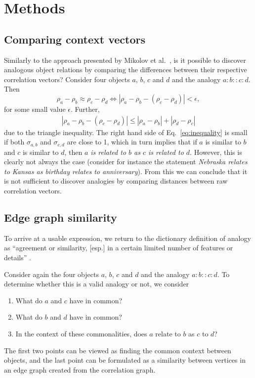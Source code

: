 \documentclass[conference]{IEEEtran}
\newcommand{\rn}[1]{\rho_{#1}}
\newcommand{\sy}[1]{\sigma_{#1}}
\begin{document}
\section{Methods}

\subsection{Comparing context vectors}
Similarly to the approach presented by Mikolov et al.\ \cite{Mikolov2013}, is it possible to discover analogous
object relations by comparing the differences between their respective correlation vectors?
Consider four objects $a$, $b$, $c$ and $d$ and the analogy $a : b :: c : d$. Then
\begin{equation}\label{}
\rn{a} - \rn{b} \approx \rn{c} - \rn{d} \Leftrightarrow |\rn{a} - \rn{b} - (\rn{c} - \rn{d})| < \epsilon,
\end{equation}
for some small value $\epsilon$. Further,
\begin{eqnarray}\label{eq:inequality}
|\rn{a} - \rn{b} - (\rn{c} - \rn{d})| \leq |\rn{a} - \rn{b}| + |\rn{d} - \rn{c}|
\end{eqnarray}
due to the triangle inequality. The right hand side of Eq.\ \ref{eq:inequality} is small if both $\sy{a,b}$ and $\sy{c,d}$
are close to 1, which in turn implies that if $a$ is similar to $b$ and $c$ is similar to $d$, then \emph{$a$ is related to $b$
as $c$ is related to $d$}. However, this is clearly not always the case (consider for instance the statement \emph{Nebraska relates to
Kansas as birthday relates to anniversary}). From this we can conclude that it is not sufficient to discover
analogies by comparing distances between raw correlation vectors.

\subsection{Edge graph similarity}

To arrive at a usable expression, we return to the dictionary definition of analogy as ``agreement or similarity, [esp.] in a certain limited number of features or details'' \cite{makins1991collins}.

Consider again the four objects $a$, $b$, $c$ and $d$ and the analogy $a : b :: c : d$. To determine whether this is a valid analogy or not, we consider
\begin{enumerate}
\item{What do $a$ and $c$ have in common?}
\item{What do $b$ and $d$ have in common?}
\item{In the context of these commonalities, does $a$ relate to $b$ as $c$ to $d$?}
\end{enumerate}
The first two points can be viewed as finding the common context between objects, and the last point can be formulated as a similarity between vertices in an edge graph created from the correlation graph.
\end{document}
